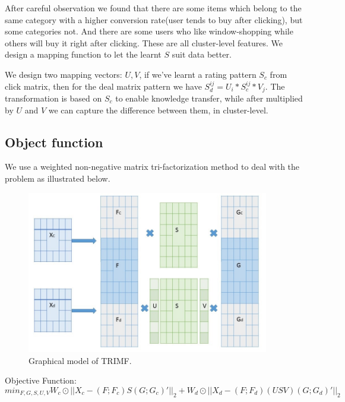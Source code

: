 \par{After careful observation we found that there are some items which belong to the same category with a higher conversion rate(user tends to buy after clicking), but some categories not. And there are some users who like window-shopping while others will buy it right after clicking. These are all cluster-level features. We design a mapping function to let the learnt $S$ suit data better. 

We design two mapping vectors: $U,V$, if we've learnt a rating pattern $S_c$ from click matrix, then for the deal matrix pattern we have $S_d^{ij} = U_i * S_c^{ij} * V_j$. The transformation is based on $S_c$ to enable knowledge transfer, while after multiplied by $U$ and $V$ we can capture the difference between them, in cluster-level. }

\subsection{Object function}
\par{We use a weighted non-negative matrix tri-factorization method to deal with the problem as illustrated below. 
\begin{figure}


\begin{center}
\includegraphics[width=400px]{fig/trimf.jpg} 
\caption{Graphical model of TRIMF.}
\label{fig:trimf}
\end{center}
\end{figure}}
 
  \par{Objective Function:$$min_{F,G,S,U,V} W_c\odot ||X_c - (F;F_c)S(G;G_c)'||_2 + W_d\odot ||X_d - (F;F_d)(USV)(G;G_d)'||_2 $$}


